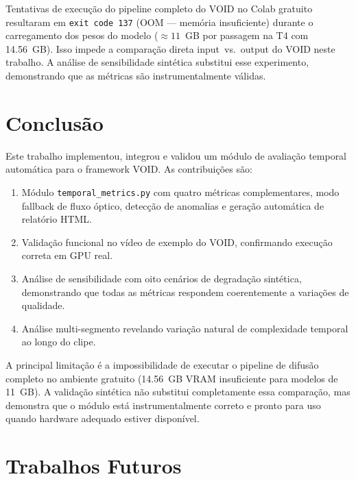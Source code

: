 \documentclass[conference]{IEEEtran}
\begin{document}
Tentativas de execução do pipeline completo do VOID no Colab gratuito resultaram em \texttt{exit code 137} (OOM — memória insuficiente) durante o carregamento dos pesos do modelo ($\approx 11$~GB por passagem na T4 com 14.56~GB). Isso impede a comparação direta input~vs.~output do VOID neste trabalho. A análise de sensibilidade sintética substitui esse experimento, demonstrando que as métricas são instrumentalmente válidas.

\section{Conclusão}

Este trabalho implementou, integrou e validou um módulo de avaliação temporal automática para o framework VOID. As contribuições são:

\begin{enumerate}
    \item Módulo \texttt{temporal\_metrics.py} com quatro métricas complementares, modo fallback de fluxo óptico, detecção de anomalias e geração automática de relatório HTML.
    \item Validação funcional no vídeo de exemplo do VOID, confirmando execução correta em GPU real.
    \item Análise de sensibilidade com oito cenários de degradação sintética, demonstrando que todas as métricas respondem coerentemente a variações de qualidade.
    \item Análise multi-segmento revelando variação natural de complexidade temporal ao longo do clipe.
\end{enumerate}

A principal limitação é a impossibilidade de executar o pipeline de difusão completo no ambiente gratuito (14.56~GB VRAM insuficiente para modelos de 11~GB). A validação sintética não substitui completamente essa comparação, mas demonstra que o módulo está instrumentalmente correto e pronto para uso quando hardware adequado estiver disponível.

\section{Trabalhos Futuros}
\end{document}
